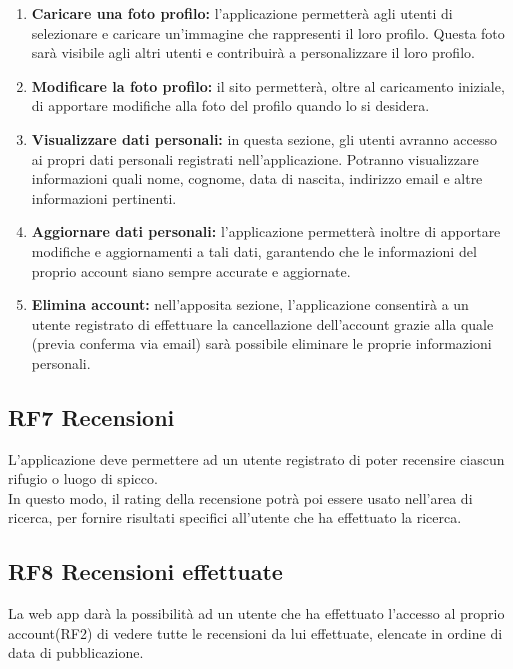 \documentclass[a4paper,12pt]{article}
\begin{document}
\begin{enumerate} [leftmargin=40pt]
  \item \textbf{Caricare una foto profilo:} l'applicazione permetterà agli utenti di selezionare e caricare un'immagine che rappresenti il loro profilo. Questa foto sarà visibile agli altri utenti e contribuirà a personalizzare il loro profilo.

  \item \textbf{Modificare la foto profilo:} il sito permetterà, oltre al caricamento iniziale, di apportare modifiche alla foto del profilo quando lo si desidera. 

  

  \item \textbf{Visualizzare dati personali:} in questa sezione, gli utenti avranno accesso ai propri dati personali registrati nell'applicazione. Potranno visualizzare informazioni quali nome, cognome, data di nascita, indirizzo email e altre informazioni pertinenti.

  \item \textbf{Aggiornare dati personali:} l'applicazione permetterà inoltre di apportare modifiche e aggiornamenti a tali dati, garantendo che le informazioni del proprio account siano sempre accurate e aggiornate.

  \item \textbf{Elimina account:} nell’apposita sezione, l'applicazione consentirà a un utente registrato di effettuare la cancellazione dell'account grazie alla quale (previa conferma via email) sarà possibile eliminare le proprie informazioni personali.
\end{enumerate}



\subsection*{RF7 Recensioni}
L'applicazione deve permettere ad un utente registrato di poter recensire ciascun rifugio o luogo di spicco.\\
In questo modo, il rating della recensione potrà poi essere usato nell'area di ricerca, per fornire risultati specifici all'utente che ha effettuato la ricerca. 


\subsection*{RF8  Recensioni effettuate}
La web app darà la possibilità ad un utente che ha effettuato l'accesso al proprio account(RF2) di vedere tutte le recensioni da lui effettuate, elencate in ordine di data di pubblicazione.
\end{document}
